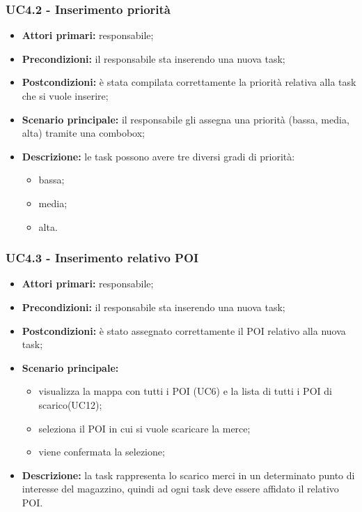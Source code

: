 \subsubsection{UC4.2 - Inserimento priorità}

\begin{itemize}
	\item 	\textbf{Attori primari:} responsabile;
	\item 	\textbf{Precondizioni:} il responsabile sta inserendo una nuova task;
	\item 	\textbf{Postcondizioni:} è stata compilata correttamente la priorità relativa alla task che si vuole inserire;
	\item 	\textbf{Scenario principale:} il responsabile gli assegna una priorità (bassa, media, alta) tramite una combobox;
	\item 	\textbf{Descrizione:} le task possono avere tre diversi gradi di priorità:
	\begin{itemize}
		\item bassa;
		\item media;
		\item alta.
	\end{itemize}
\end{itemize}

\subsubsection{UC4.3 - Inserimento relativo POI}

\begin{itemize}
	\item 	\textbf{Attori primari:} responsabile;
	\item 	\textbf{Precondizioni:} il responsabile sta inserendo una nuova task;
	\item 	\textbf{Postcondizioni:} è stato assegnato correttamente il POI relativo alla nuova task;
	\item 	\textbf{Scenario principale:}
	\begin{itemize}
		\item visualizza la mappa con tutti i POI (UC6) e la lista di tutti i POI di scarico(UC12);
		\item seleziona il POI in cui si vuole scaricare la merce;
		\item viene confermata la selezione;
	\end{itemize}
	\item 	\textbf{Descrizione:} la task rappresenta lo scarico merci in un determinato punto di interesse del magazzino, quindi ad ogni task deve essere affidato il relativo POI.
\end{itemize}
